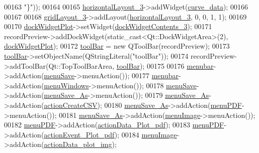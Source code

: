 \begin{DoxyCode}
00163 \textcolor{stringliteral}{"\}"}));
00164 
00165         \hyperlink{a00081_a14cf293099dc18a097ecd71460db1701}{horizontalLayout\_3}->addWidget(\hyperlink{a00081_a247d94481323c0bc4f8b6458a8a535dd}{curve\_data});
00166 
00167 
00168         \hyperlink{a00081_a4edfeb379ee365973f74b0e422fd9916}{gridLayout\_3}->addLayout(\hyperlink{a00081_a14cf293099dc18a097ecd71460db1701}{horizontalLayout\_3}, 0, 0, 1, 1);
00169 
00170         \hyperlink{a00081_a07b76f17803ec09e0367b72938bbd097}{dockWidgetPlot}->setWidget(\hyperlink{a00081_a26b0f4ae45c1aa0cfd8037f25a2f290f}{dockWidgetContents\_3});
00171         recordPreview->addDockWidget(static\_cast<Qt::DockWidgetArea>(2), 
      \hyperlink{a00081_a07b76f17803ec09e0367b72938bbd097}{dockWidgetPlot});
00172         \hyperlink{a00081_ac94509c2cd16337592e1634b0f2a6020}{toolBar} = \textcolor{keyword}{new} QToolBar(recordPreview);
00173         \hyperlink{a00081_ac94509c2cd16337592e1634b0f2a6020}{toolBar}->setObjectName(QStringLiteral(\textcolor{stringliteral}{"toolBar"}));
00174         recordPreview->addToolBar(Qt::TopToolBarArea, \hyperlink{a00081_ac94509c2cd16337592e1634b0f2a6020}{toolBar});
00175 
00176         \hyperlink{a00081_adddc4285028693f10dfd49cd08276e83}{menubar}->addAction(\hyperlink{a00081_a5ef77bf8c78c201d83049ee8b40cf345}{menuSave}->menuAction());
00177         \hyperlink{a00081_adddc4285028693f10dfd49cd08276e83}{menubar}->addAction(\hyperlink{a00081_afd93511da273fc2c6a88472d154cb176}{menuWindows}->menuAction());
00178         \hyperlink{a00081_a5ef77bf8c78c201d83049ee8b40cf345}{menuSave}->addAction(\hyperlink{a00081_aaf69c873ec3bf0ea397829122ca4a224}{menuSave\_As}->menuAction());
00179         \hyperlink{a00081_aaf69c873ec3bf0ea397829122ca4a224}{menuSave\_As}->addAction(\hyperlink{a00081_ae81b7303db9e9c5d730c59b86ec0e960}{actionCreateCSV});
00180         \hyperlink{a00081_aaf69c873ec3bf0ea397829122ca4a224}{menuSave\_As}->addAction(\hyperlink{a00081_a4cdb6b113583d4ef43a08b5526c13e3a}{menuPDF}->menuAction());
00181         \hyperlink{a00081_aaf69c873ec3bf0ea397829122ca4a224}{menuSave\_As}->addAction(\hyperlink{a00081_af1ff1ecbe6ea007cfeda320cca9865b7}{menuImage}->menuAction());
00182         \hyperlink{a00081_a4cdb6b113583d4ef43a08b5526c13e3a}{menuPDF}->addAction(\hyperlink{a00081_a19203ba5fef3bc68f3d88f1dd3c94777}{actionData\_Plot\_pdf});
00183         \hyperlink{a00081_a4cdb6b113583d4ef43a08b5526c13e3a}{menuPDF}->addAction(\hyperlink{a00081_a4369770edbf9cb6131a066ca10b3f863}{actionEvent\_Plot\_pdf});
00184         \hyperlink{a00081_af1ff1ecbe6ea007cfeda320cca9865b7}{menuImage}->addAction(\hyperlink{a00081_ae841c150cf6131bef2e8d12da0401ce2}{actionData\_plot\_img});

\end{DoxyCode}
